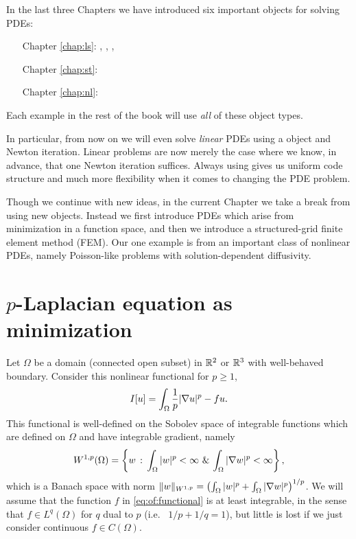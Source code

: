 
In the last three Chapters we have introduced six important \PETSc objects for solving PDEs:
\begin{itemize}
\item[\quad Chapter \ref{chap:ls}:] \pVec, \pMat, \pKSP, \pPC
\item[\quad Chapter \ref{chap:st}:] \pDM{}
\item[\quad Chapter \ref{chap:nl}:] \pSNES
\end{itemize}
Each example in the rest of the book will use \emph{all} of these object types.

In particular, from now on we will even solve \emph{linear} PDEs using a \pSNES object and Newton iteration.  Linear problems are now merely the case where we know, in advance, that one Newton iteration suffices.  Always using \pSNES gives us uniform code structure and much more flexibility when it comes to changing the PDE problem.

Though we continue with new ideas, in the current Chapter we take a break from using new \PETSc objects.  Instead we first introduce PDEs which arise from minimization in a function space, and then we introduce a structured-grid finite element method (FEM).  Our one example is from an important class of nonlinear PDEs, namely Poisson-like problems with solution-dependent diffusivity.


\section{$p$-Laplacian equation as minimization}

Let $\Omega$ be a domain (connected open subset) in $\mathbb{R}^2$ or $\mathbb{R}^3$ with well-behaved boundary.  Consider this nonlinear functional for $p \ge 1$,
\begin{equation}
    I[u] = \int_\Omega \frac{1}{p} |\nabla u|^p - fu.  \label{eq:of:functional}
\end{equation}
This functional is well-defined on the Sobolev space \citep{Evans2010} of integrable functions which are defined on $\Omega$ and have integrable gradient, namely
\begin{equation}
    W^{1,p}(\Omega) = \left\{w \,:\, \int_\Omega |w|^p < \infty \,\, \& \, \int_\Omega |\nabla w|^p < \infty\right\}, \label{eq:of:sobolevdefn}
\end{equation}
which is a Banach space with norm $\|w\|_{W^{1,p}} = \left(\int_\Omega |w|^p + \int_\Omega |\nabla w|^p\right)^{1/p}$.  We will assume that the function $f$ in \eqref{eq:of:functional} is at least integrable, in the sense that $f\in L^q(\Omega)$ for $q$ dual to $p$ (i.e.~ $1/p+1/q=1$), but little is lost if we just consider continuous $f\in C(\Omega)$.

